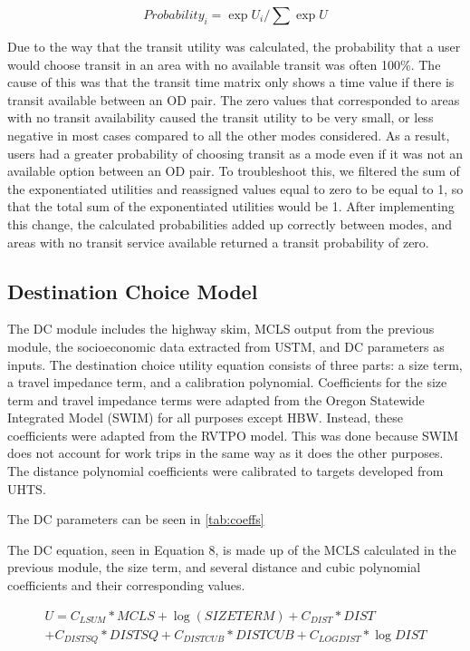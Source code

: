 \begin{equation}
	Probability_i = \exp U_i / \sum \exp U
	\label{eqn:prob}
\end{equation}

Due to the way that the transit utility was calculated, the probability that a user would choose transit in an area with no available transit was often 100\%. The cause of this was that the transit time matrix only shows a time value if there is transit available between an OD pair. The zero values that corresponded to areas with no transit availability caused the transit utility to be very small, or less negative in most cases compared to all the other modes considered. As a result, users had a greater probability of choosing transit as a mode even if it was not an available option between an OD pair. To troubleshoot this, we filtered the sum of the exponentiated utilities and reassigned values equal to zero to be equal to 1, so that the total sum of the exponentiated utilities would be 1. After implementing this change, the calculated probabilities added up correctly between modes, and areas with no transit service available returned a transit probability of zero.

\subsection{Destination Choice Model}


The DC module
includes the highway skim, MCLS output from the previous module, the socioeconomic data extracted
from USTM, and DC parameters as inputs.
The destination choice utility equation consists of three parts: a size term,
a travel impedance term, and a calibration polynomial. Coefficients for the
size term and travel impedance terms were adapted from the Oregon
Statewide Integrated Model (SWIM) for all purposes except HBW. Instead, these coefficients were
adapted from the RVTPO model. This was done because SWIM does not account for work trips in the same way as it does the other purposes. The distance polynomial coefficients were
calibrated to targets developed from UHTS.

The DC parameters can be seen in \ref{tab:coeffs}

The DC equation, seen in Equation 8, is made up of the
MCLS calculated in the previous module, the size term, and several distance and cubic polynomial
coefficients and their corresponding values.

\begin{equation}
\begin{aligned}
	U = C_{LSUM} * MCLS + \log (SIZETERM) + C_{DIST} * DIST\\ + C_{DISTSQ} *
  DISTSQ + C_{DISTCUB} * DISTCUB + C_{LOGDIST} * \log DIST
\label{eqn:dc}
\end{aligned}
\end{equation}

